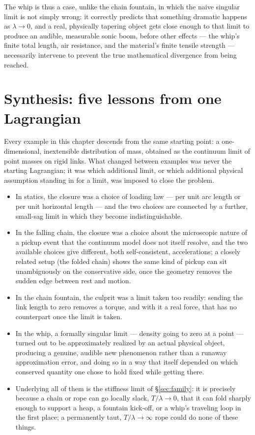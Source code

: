 \documentclass[11pt]{book}
\begin{document}
The whip is thus a case, unlike the chain fountain, in which the naive singular limit is not simply wrong: it correctly predicts that something dramatic happens as $\lambda\to 0$, and a real, physically tapering object gets close enough to that limit to produce an audible, measurable sonic boom, before other effects --- the whip's finite total length, air resistance, and the material's finite tensile strength --- necessarily intervene to prevent the true mathematical divergence from being reached.

\section{Synthesis: five lessons from one Lagrangian}
\label{sec:synthesis}

Every example in this chapter descends from the same starting point: a one-dimensional, inextensible distribution of mass, obtained as the continuum limit of point masses on rigid links. What changed between examples was never the starting Lagrangian; it was which additional limit, or which additional physical assumption standing in for a limit, was imposed to close the problem.

\begin{itemize}
\item In statics, the closure was a choice of loading law --- per unit arc length or per unit horizontal length --- and the two choices are connected by a further, small-sag limit in which they become indistinguishable.
\item In the falling chain, the closure was a choice about the microscopic nature of a pickup event that the continuum model does not itself resolve, and the two available choices give different, both self-consistent, accelerations; a closely related setup (the folded chain) shows the same kind of pickup can sit unambiguously on the conservative side, once the geometry removes the sudden edge between rest and motion.
\item In the chain fountain, the culprit was a limit taken too readily: sending the link length to zero removes a torque, and with it a real force, that has no counterpart once the limit is taken.
\item In the whip, a formally singular limit --- density going to zero at a point --- turned out to be approximately realized by an actual physical object, producing a genuine, audible new phenomenon rather than a runaway approximation error, and doing so in a way that itself depended on which conserved quantity one chose to hold fixed while getting there.
\item Underlying all of them is the stiffness limit of \S\ref{sec:family}: it is precisely because a chain or rope can go locally slack, $T/\lambda\to 0$, that it can fold sharply enough to support a heap, a fountain kick-off, or a whip's traveling loop in the first place; a permanently taut, $T/\lambda\to\infty$ rope could do none of these things.
\end{itemize}
\end{document}
